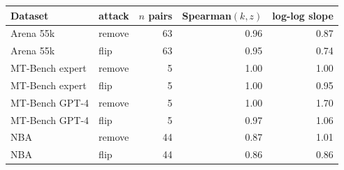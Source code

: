 {\footnotesize\setlength{\tabcolsep}{3pt}\begin{tabular}{@{}llrrr@{}}\toprule
Dataset & attack & $n$ pairs & Spearman$(k,z)$ & log-log slope\\\midrule
Arena 55k & remove & 63 & 0.96 & 0.87 \\
Arena 55k & flip & 63 & 0.95 & 0.74 \\
MT-Bench expert & remove & 5 & 1.00 & 1.00 \\
MT-Bench expert & flip & 5 & 1.00 & 0.95 \\
MT-Bench GPT-4 & remove & 5 & 1.00 & 1.70 \\
MT-Bench GPT-4 & flip & 5 & 0.97 & 1.06 \\
NBA & remove & 44 & 0.87 & 1.01 \\
NBA & flip & 44 & 0.86 & 0.86 \\
\bottomrule\end{tabular}}
